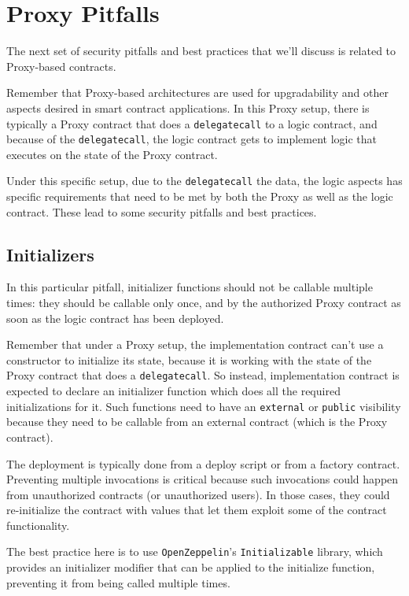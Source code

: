 \section{Proxy Pitfalls}\label{proxy-pitfalls}

The next set of security pitfalls and best practices that we'll discuss
is related to Proxy-based contracts.

Remember that Proxy-based architectures are used for upgradability and
other aspects desired in smart contract applications. In this Proxy
setup, there is typically a Proxy contract that does a
\texttt{delegatecall} to a logic contract, and because of the
\texttt{delegatecall}, the logic contract gets to implement logic that
executes on the state of the Proxy contract.

Under this specific setup, due to the \texttt{delegatecall} the data,
the logic aspects has specific requirements that need to be met by both
the Proxy as well as the logic contract. These lead to some security
pitfalls and best practices.

\subsection{Initializers}\label{initializers}

In this particular pitfall, initializer functions should not be callable
multiple times: they should be callable only once, and by the authorized
Proxy contract as soon as the logic contract has been deployed.

Remember that under a Proxy setup, the implementation contract can't use
a constructor to initialize its state, because it is working with the
state of the Proxy contract that does a \texttt{delegatecall}. So
instead, implementation contract is expected to declare an initializer
function which does all the required initializations for it. Such
functions need to have an \texttt{external} or \texttt{public}
visibility because they need to be callable from an external contract
(which is the Proxy contract).

The deployment is typically done from a deploy script or from a factory
contract. Preventing multiple invocations is critical because such
invocations could happen from unauthorized contracts (or unauthorized
users). In those cases, they could re-initialize the contract with
values that let them exploit some of the contract functionality.

The best practice here is to use \texttt{OpenZeppelin}'s
\texttt{Initializable} library, which provides an initializer modifier
that can be applied to the initialize function, preventing it from being
called multiple times.

